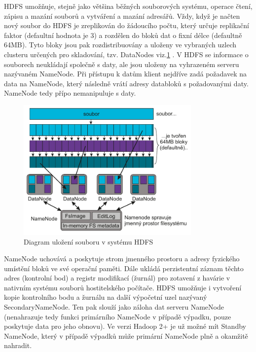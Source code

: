 \documentclass[thesis=M,czech]{FITthesis}[2012/06/26]
\begin{document}
HDFS umožňuje, stejně jako většina běžných souborových systému, operace čtení, zápisu a mazání souborů a vytváření a mazání adresářů. Vždy, když je načten nový soubor do HDFS je zreplikován do žádoucího počtu, který určuje replikační faktor (defaultní hodnota je 3) a rozdělen do bloků dat o fixní délce (defaultně 64MB). Tyto bloky jsou pak rozdistribuovány a uloženy  ve vybraných uzlech clusteru určených pro skladování, tzv. DataNodes viz.\ref{fig:hdfs} . V HDFS se informace o souborech neukládají společně s daty, ale jsou uloženy na vyhrazeném serveru nazývaném NameNode. Při přístupu k datům klient nejdříve zadá požadavek na data na NameNode, který následně vrátí adresy databloků s požadovanými daty. NameNode tedy přípo nemanipuluje s daty.

\begin{figure}\centering
	\includegraphics[width=0.8\textwidth, angle=0]{files/hdfs}
	\caption[Diagram uložení souboru v systému HDFS]{Diagram uložení souboru v systému HDFS}\label{fig:hdfs}
\end{figure}

NameNode uchovává a poskytuje strom jmenného prostoru a adresy fyzického umístění bloků ve své operační paměti. Dále ukládá perzistentní záznam těchto adres (kontrolní bod) a registr modifikací (žurnál) pro zotavení z havárie v nativním systému souborů hostitelského počítače. HDFS umožňuje i  vytvoření kopie kontrolního bodu a žurnálu na další výpočetní uzel nazývaný SecondaryNameNode. Ten pak slouží jako záloha dat serveru NameNode  (nenahrazuje tedy funkci primárního NameNode v případě výpadku, pouze poskytuje data pro jeho obnovu). Ve verzi Hadoop 2+ je už možné mít Standby NameNode, který v případě výpadků může primární NameNode plně a okamžitě nahradit. 
\end{document}
